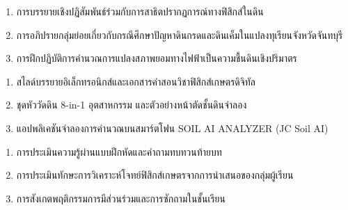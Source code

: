 \begin{tcolorbox}[
    enhanced, breakable,
    colback=white, colframe=rbruNavy,
    fonttitle=\bfseries\color{white},
    title={3. วิธีสอนและกิจกรรมการเรียนการสอน},
    arc=1.5mm, boxrule=0.8pt, leftrule=3.5mm
]
\begin{enumerate}
    \item การบรรยายเชิงปฏิสัมพันธ์ร่วมกับการสาธิตปรากฏการณ์ทางฟิสิกส์ในดิน
    \item การอภิปรายกลุ่มย่อยเกี่ยวกับกรณีศึกษาปัญหาดินกรดและดินเค็มในแปลงทุเรียนจังหวัดจันทบุรี
    \item การฝึกปฏิบัติการคำนวณการแปลงสภาพยอมทางไฟฟ้าเป็นความชื้นดินเชิงปริมาตร
\end{enumerate}
\end{tcolorbox}

\begin{tcolorbox}[
    enhanced, breakable,
    colback=white, colframe=rbruNavy,
    fonttitle=\bfseries\color{white},
    title={4. สื่อการเรียนการสอน},
    arc=1.5mm, boxrule=0.8pt, leftrule=3.5mm
]
\begin{enumerate}
    \item สไลด์บรรยายอิเล็กทรอนิกส์และเอกสารคำสอนวิชาฟิสิกส์เกษตรดิจิทัล
    \item ชุดหัววัดดิน 8-in-1 อุตสาหกรรม และตัวอย่างหน้าตัดชั้นดินจำลอง
    \item แอปพลิเคชันจำลองการคำนวณบนสมาร์ตโฟน SOIL AI ANALYZER (JC Soil AI)
\end{enumerate}
\end{tcolorbox}

\begin{tcolorbox}[
    enhanced, breakable,
    colback=white, colframe=rbruNavy,
    fonttitle=\bfseries\color{white},
    title={5. การวัดและประเมินผล},
    arc=1.5mm, boxrule=0.8pt, leftrule=3.5mm
]
\begin{enumerate}
    \item การประเมินความรู้ผ่านแบบฝึกหัดและคำถามทบทวนท้ายบท
    \item การประเมินทักษะการวิเคราะห์โจทย์ฟิสิกส์เกษตรจากการนำเสนอของกลุ่มผู้เรียน
    \item การสังเกตพฤติกรรมการมีส่วนร่วมและการซักถามในชั้นเรียน
\end{enumerate}
\end{tcolorbox}

\clearpage

